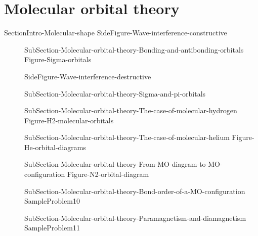 \documentclass[main.tex]{subfiles}
\newcommand\chapterlabel{Ch-electronicstructure}\setcounter{figurenewcounter}{0}\setcounter{tablenewcounter}{0}\setcounter{formulanewcounter}{0}\chapterpicture{../{\chapterlabel}/figure1}\chapterpicturelabel{PxFuel}
\begin{document}
\section{Molecular orbital theory}
{SectionIntro-Molecular-shape} 
{SideFigure-Wave-interference-constructive}	
\sloppy\begin{description}
\item[] {SubSection-Molecular-orbital-theory-Bonding-and-antibonding-orbitals}
{Figure-Sigma-orbitals}  \vspace{4cm}
 
 {SideFigure-Wave-interference-destructive}  
\item[] {SubSection-Molecular-orbital-theory-Sigma-and-pi-orbitals}
\vspace{-1cm}{Figure-Pi-orbitals}
\item[] {SubSection-Molecular-orbital-theory-The-case-of-molecular-hydrogen}
{Figure-H2-molecular-orbitals}
\item[] {SubSection-Molecular-orbital-theory-The-case-of-molecular-helium}
{Figure-He-orbital-diagrams}
\item[] {SubSection-Molecular-orbital-theory-From-MO-diagram-to-MO-configuration}
{Figure-N2-orbital-diagram}
\item[] {SubSection-Molecular-orbital-theory-Bond-order-of-a-MO-configuration}
{SampleProblem10}
\item[] {SubSection-Molecular-orbital-theory-Paramagnetism-and-diamagnetism}
{SampleProblem11}
\end{description}




 \checkoddpage\ifoddpage \clearpage\thispagestyle{empty}\mbox{}\clearpage \else  \fi 
\end{document}
